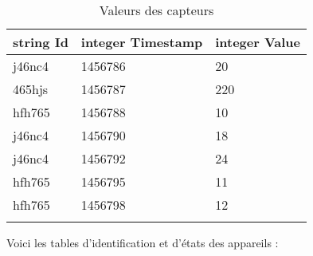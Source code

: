 \documentclass[10pt,a4paper]{article}
\begin{document}
\begin{table}[h!]
\centering
    \begin{tabular}{|l|l|l|}
    \hline
    \rowcolor[HTML]{EFEFEF} 
    string Id & integer Timestamp & integer Value \\ \hline
    j46nc4    & 1456786           & 20            \\ \hline
    465hjs    & 1456787           & 220           \\ \hline
    hfh765    & 1456788           & 10            \\ \hline
    j46nc4    & 1456790           & 18            \\ \hline
    j46nc4    & 1456792           & 24            \\ \hline
    hfh765    & 1456795           & 11            \\ \hline
    hfh765    & 1456798           & 12            \\ \hline
              &                   &              
    \end{tabular}
    \caption{Valeurs des capteurs}
\end{table}
Voici les tables d'identification et d'états des appareils :
\end{document}
